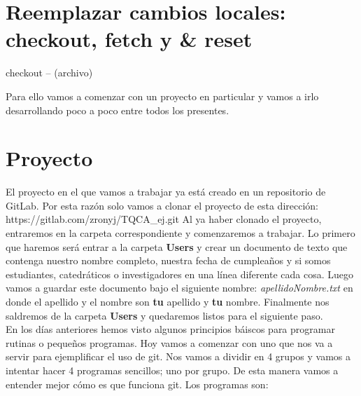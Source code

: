 \documentclass[10pt,letterpaper]{article}
\begin{document}
\section{Reemplazar cambios locales: checkout, fetch y \& reset}
checkout -- (archivo)

Para ello vamos a comenzar con un proyecto en particular y vamos a irlo desarrollando poco a poco entre todos los presentes.

\section{Proyecto}
El proyecto en el que vamos a trabajar ya est\'a creado en un repositorio de GitLab. Por esta raz\'on solo vamos a clonar el proyecto de esta direcci\'on: https://gitlab.com/zronyj/TQCA\_ej.git Al ya haber clonado el proyecto, entraremos en la carpeta correspondiente y comenzaremos a trabajar. Lo primero que haremos ser\'a entrar a la carpeta \textbf{Users} y crear un documento de texto que contenga nuestro nombre completo, nuestra fecha de cumplea\~nos y si somos estudiantes, catedr\'aticos o investigadores en una l\'inea diferente cada cosa. Luego vamos a guardar este documento bajo el siguiente nombre: \emph{apellidoNombre.txt} en donde el apellido y el nombre son \textbf{tu} apellido y \textbf{tu} nombre. Finalmente nos saldremos de la carpeta \textbf{Users} y quedaremos listos para el siguiente paso.\\

En los d\'ias anteriores hemos visto algunos principios b\'aiscos para programar rutinas o peque\~nos programas. Hoy vamos a comenzar con uno que nos va a servir para ejemplificar el uso de git. Nos vamos a dividir en 4 grupos y vamos a intentar hacer 4 programas sencillos; uno por grupo. De esta manera vamos a entender mejor c\'omo es que funciona git. Los programas son:
\end{document}
